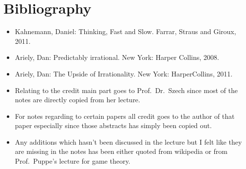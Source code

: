 

\chapter*{Bibliography}

\begin{itemize}
	\item Kahnemann, Daniel: Thinking, Fast and Slow. Farrar, Straus and Giroux, 2011.
	\item Ariely, Dan: Predictably irrational. New York: Harper Collins, 2008.
	\item Ariely, Dan: The Upside of Irrationality. New York: HarperCollins, 2011. 
	\item Relating to the credit main part goes to Prof.~Dr.~Szech since most of the notes are directly copied from her lecture. 
	\item For notes regarding to certain papers all credit goes to the author of that paper especially since those abstracts has simply been copied out.
	\item Any additions which hasn't been discussed in the lecture but I felt like they are missing in the notes has been either quoted from wikipedia or from Prof.~Puppe's lecture for game theory.
\end{itemize}